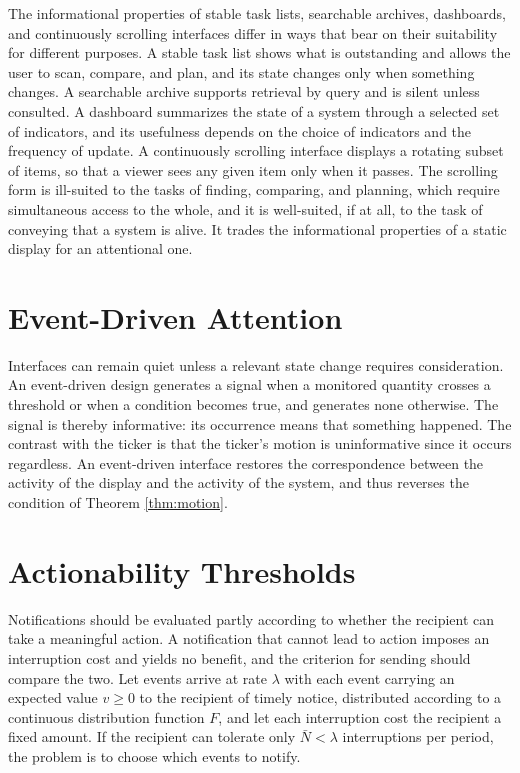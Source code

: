 \documentclass[11pt]{report}
\theoremstyle{definition}
\theoremstyle{remark}
\begin{document}
The informational properties of stable task lists, searchable archives, dashboards, and continuously scrolling interfaces differ in ways that bear on their suitability for different purposes. A stable task list shows what is outstanding and allows the user to scan, compare, and plan, and its state changes only when something changes. A searchable archive supports retrieval by query and is silent unless consulted. A dashboard summarizes the state of a system through a selected set of indicators, and its usefulness depends on the choice of indicators and the frequency of update. A continuously scrolling interface displays a rotating subset of items, so that a viewer sees any given item only when it passes. The scrolling form is ill-suited to the tasks of finding, comparing, and planning, which require simultaneous access to the whole, and it is well-suited, if at all, to the task of conveying that a system is alive. It trades the informational properties of a static display for an attentional one.

\section{Event-Driven Attention}

Interfaces can remain quiet unless a relevant state change requires consideration. An event-driven design generates a signal when a monitored quantity crosses a threshold or when a condition becomes true, and generates none otherwise. The signal is thereby informative: its occurrence means that something happened. The contrast with the ticker is that the ticker's motion is uninformative since it occurs regardless. An event-driven interface restores the correspondence between the activity of the display and the activity of the system, and thus reverses the condition of Theorem \ref{thm:motion}.

\section{Actionability Thresholds}

Notifications should be evaluated partly according to whether the recipient can take a meaningful action. A notification that cannot lead to action imposes an interruption cost and yields no benefit, and the criterion for sending should compare the two. Let events arrive at rate $\lambda$ with each event carrying an expected value $v\ge0$ to the recipient of timely notice, distributed according to a continuous distribution function $F$, and let each interruption cost the recipient a fixed amount. If the recipient can tolerate only $\bar N<\lambda$ interruptions per period, the problem is to choose which events to notify.
\end{document}

